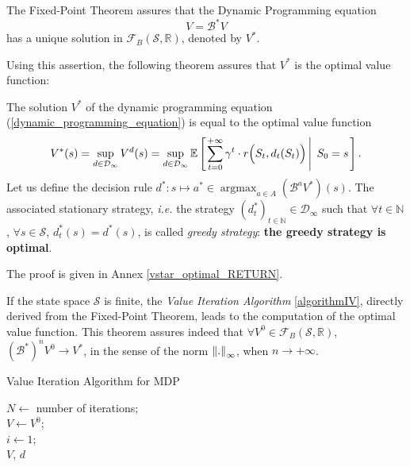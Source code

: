 The Fixed-Point Theorem assures that the Dynamic Programming equation
\begin{equation} 
\label{dynamic_programming_equation} V = \mathcal{B}^*V
\end{equation}
has a unique solution in $\mathcal{F}_{B}(\mathcal{S},\mathbb{R})$,
denoted by $V^*$.

Using this assertion, the following theorem assures that $V^*$ is the optimal value function:
\begin{theorem}
The solution $V^*$ of the dynamic programming equation (\ref{dynamic_programming_equation})
is equal to the optimal value function
\label{vstar_optimal}
\[ V^*(s) = \sup_{d \in \mathcal{D}_{\infty}} V^d(s) =\sup_{d \in \mathcal{D}_{\infty}} \mathbb{E} \left[ \left. \sum_{t=0}^{+ \infty} \gamma^t \cdot r\Big(S_t,d_t(S_t)\Big) \, \right| \left. \, S_0=s  \right. \right]. \]
Let us define the decision rule $d^*:  s \mapsto a^* \in \operatorname*{argmax}_{a \in A}(\mathcal{B}^a V^*)(s)$.
The associated stationary strategy, \textit{i.e.} 
the strategy $(d^*_t)_{t \in \mathbb{N}} \in \mathcal{D}_{\infty}$
such that $\forall t \in \mathbb{N}$,
$\forall s \in \mathcal{S}$,
$d_t^*(s)=d^*(s)$, 
is called \textit{greedy strategy}:
\textbf{the greedy strategy is optimal}.
\end{theorem}
The proof is given in Annex \ref{vstar_optimal_RETURN}.

If the state space $\mathcal{S}$ is finite, 
the \textit{Value Iteration Algorithm} \ref{algorithmIV},
directly derived from the Fixed-Point Theorem, 
leads to the computation of the optimal value function. 
This theorem assures indeed that 
$\forall V^0 \in \mathcal{F}_{B}(\mathcal{S},\mathbb{R})$, 
$(\mathcal{B}^*)^n V^0 \longrightarrow V^*$,
in the sense of the norm $\left\lVert . \right\rVert_{\infty}$,
when $n \rightarrow + \infty$.

\begin{algorithm} \caption{Value Iteration Algorithm for MDP} \label{algorithmIV}
$N \gets$ number of iterations;\\ 
$V \gets V^0$; \\
$i \gets 1$; \\
\Return $V$, $d$
\end{algorithm}

